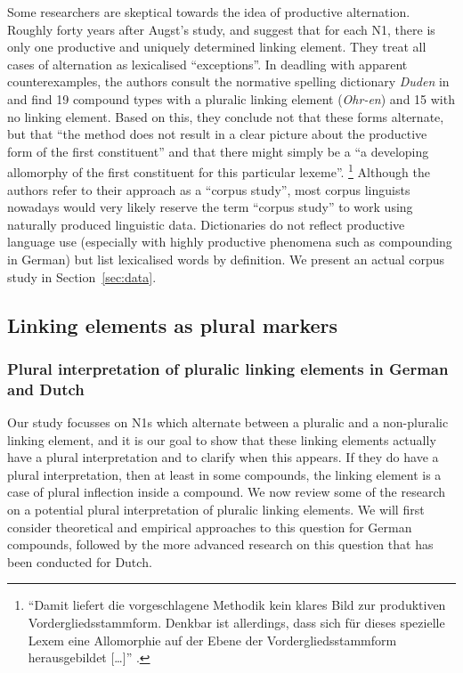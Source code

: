 Some researchers are skeptical towards the idea of productive alternation.
Roughly forty years after Augst's study, \textcite[31]{NeefBorgwaldt2012} and \textcite[46]{Neef2015} suggest that for each N1, there is only one productive and uniquely determined linking element.
They treat all cases of alternation as lexicalised ``exceptions''.
In deadling with apparent counterexamples, the authors consult the normative spelling dictionary \textit{Duden} \parencite{Duden2006} in \textcite[42]{NeefBorgwaldt2012} and find 19 compound types with a pluralic linking element (\textit{Ohr-en}) and 15 with no linking element.
Based on this, they conclude not that these forms alternate, but that ``the method does not result in a clear picture about the productive form of the first constituent'' and that there might simply be a ``a developing allomorphy of the first constituent for this particular lexeme''.%
\footnote{``Damit liefert die vorgeschlagene Methodik kein klares Bild zur produktiven Vordergliedsstammform.
Denkbar ist allerdings, dass sich für dieses spezielle Lexem eine Allomorphie auf der Ebene der Vordergliedsstammform herausgebildet [\ldots]'' \parencite[31]{NeefBorgwaldt2012}.}
Although the authors refer to their approach as a ``corpus study'', most corpus linguists nowadays would very likely reserve the term ``corpus study'' to work using naturally produced linguistic data.
Dictionaries do not reflect productive language use (especially with highly productive phenomena such as compounding in German) but list lexicalised words by definition.
We present an actual corpus study in Section~\ref{sec:data}.


\subsection{Linking elements as plural markers}
\label{sec:linkagesaspluralmarkers}

\subsubsection{Plural interpretation of pluralic linking elements in German and Dutch}
\label{sec:pluralinterpretationofpluraliclinkagesingermananddutch}

Our study focusses on N1s which alternate between a pluralic and a non-pluralic linking element, and it is our goal to show that these linking elements actually have a plural interpretation and to clarify when this appears.
If they do have a plural interpretation, then at least in some compounds, the linking element is a case of plural inflection inside a compound.
We now review some of the research on a potential plural interpretation of pluralic linking elements.
We will first consider theoretical and empirical approaches to this question for German compounds, followed by the more advanced research on this question that has been conducted for Dutch.

